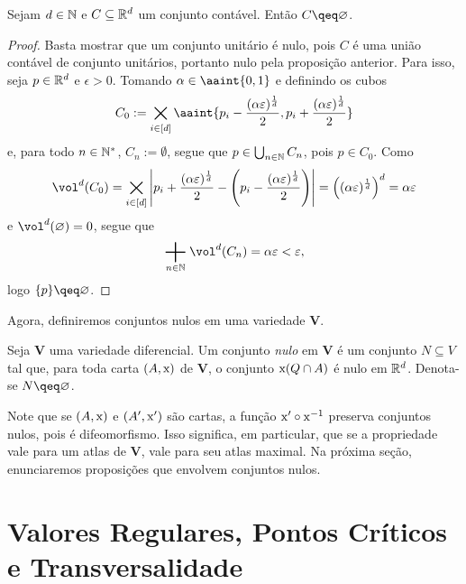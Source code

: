\begin{prop}
Sejam $d \in \mathbb{N}$ e $C \subseteq \mathbb{R}^d$ um conjunto contável. Então $C \qeq \emptyset$.
\end{prop}
\begin{proof}
Basta mostrar que um conjunto unitário é nulo, pois $C$ é uma união contável de conjunto unitários, portanto nulo pela proposição anterior. Para isso, seja $p \in \mathbb{R}^d$ e $\epsilon > 0$. Tomando $\alpha \in \aaint{0,1}$ e definindo os cubos
		\begin{equation*}
		C_0 := \bigtimes_{i \in [d]} \aaint{p_i - \frac{(\alpha\varepsilon)^{\frac{1}{d}}}{2}, p_i + \frac{(\alpha\varepsilon)^{\frac{1}{d}}}{2}}
		\end{equation*}
e, para todo $n \in \mathbb{N}^*$, $C_n := \emptyset$, segue que $p \in \bigcup_{n \in \mathbb{N}} C_n$, pois $p \in C_0$. Como
	\begin{equation*}
	\vol^d(C_0) = \bigtimes_{i \in [d]} \abs{p_i + \frac{(\alpha\varepsilon)^{\frac{1}{d}}}{2} - \left(p_i - \frac{(\alpha\varepsilon)^{\frac{1}{d}}}{2} \right)} = \left( (\alpha\varepsilon)^{\frac{1}{d}} \right)^d = \alpha\varepsilon
	\end{equation*}
e $\vol^d(\emptyset)=0$, segue que
	\begin{equation*}
	\sum_{n \in \N} \vol^d(C_n) = \alpha\varepsilon < \varepsilon,
	\end{equation*}
logo $\{p\} \qeq \emptyset$.
\end{proof}

Agora, definiremos conjuntos nulos em uma variedade $\bm V$.

\begin{defi}
Seja $\bm V$ uma variedade diferencial. Um conjunto \emph{nulo} em $\bm V$ é um conjunto $N \subseteq V$ tal que, para toda carta $(A,\mathrm{x})$ de $\bm V$, o conjunto $\mathrm{x}(Q \cap A)$ é nulo em $\mathbb{R}^d$. Denota-se $N \qeq \emptyset$.
\end{defi}

Note que se $(A,\mathrm{x})$ e $(A',\mathrm{x}')$ são cartas, a função $\mathrm{x}' \circ \mathrm{x}^{-1}$ preserva conjuntos nulos, pois é difeomorfismo. Isso significa, em particular, que se a propriedade vale para um atlas de $\bm V$, vale para seu atlas maximal. Na próxima seção, enunciaremos proposições que envolvem conjuntos nulos.

\section{Valores Regulares, Pontos Críticos e Transversalidade}


